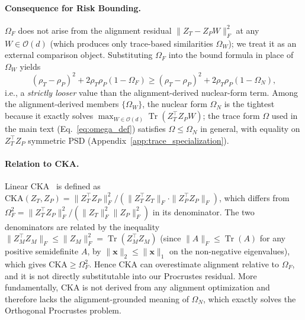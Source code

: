 \paragraph{Consequence for Risk Bounding.}
$\Omega_F$ does not arise from the alignment residual $\|Z_T - Z_P W\|_F^2$ at any $W \in \mathcal{O}(d)$ (which produces only trace-based similarities $\Omega_W$); we treat it as an external comparison object. Substituting $\Omega_F$ into the bound formula in place of $\Omega_W$ yields
\begin{equation}
(\rho_T - \rho_P)^2 + 2\rho_T\rho_P(1 - \Omega_F) \ge (\rho_T - \rho_P)^2 + 2\rho_T\rho_P(1 - \Omega_N),
\end{equation}
i.e., a \emph{strictly looser} value than the alignment-derived nuclear-form term. Among the alignment-derived members $\{\Omega_W\}$, the nuclear form $\Omega_N$ is the tightest because it exactly solves $\max_{W \in \mathcal{O}(d)} \operatorname{Tr}(Z_T^\top Z_P W)$; the trace form $\Omega$ used in the main text (Eq.~\ref{eq:omega_def}) satisfies $\Omega \le \Omega_N$ in general, with equality on $Z_T^\top Z_P$ symmetric PSD (Appendix~\ref{app:trace_specialization}).

\paragraph{Relation to CKA.}
Linear CKA~\cite{kornblith2019similarity} is defined as $\mathrm{CKA}(Z_T, Z_P) = \|Z_T^\top Z_P\|_F^2 / (\|Z_T^\top Z_T\|_F \cdot \|Z_P^\top Z_P\|_F)$, which differs from $\Omega_F^2 = \|Z_T^\top Z_P\|_F^2 / (\|Z_T\|_F^2 \|Z_P\|_F^2)$ in its denominator. The two denominators are related by the inequality $\|Z_M^\top Z_M\|_F \le \|Z_M\|_F^2 = \operatorname{Tr}(Z_M^\top Z_M)$ (since $\|A\|_F \le \operatorname{Tr}(A)$ for any positive semidefinite $A$, by $\|\mathbf{x}\|_2 \le \|\mathbf{x}\|_1$ on the non-negative eigenvalues), which gives $\mathrm{CKA} \ge \Omega_F^2$. Hence CKA can overestimate alignment relative to $\Omega_F$, and it is not directly substitutable into our Procrustes residual. More fundamentally, CKA is not derived from any alignment optimization and therefore lacks the alignment-grounded meaning of $\Omega_N$, which exactly solves the Orthogonal Procrustes problem.
